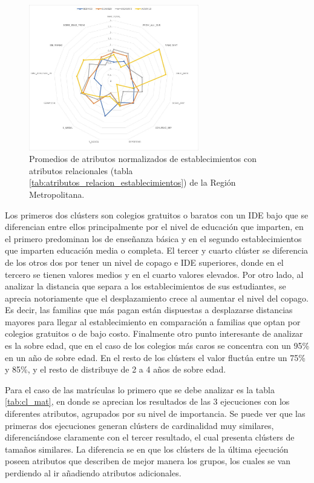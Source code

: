 \begin{figure}[hc]
    \centering
    \includegraphics[width=0.66\textwidth]{images/radar_chart_establecimientos_con.jpg}
    \caption{Promedios de atributos normalizados de establecimientos con atributos relacionales (tabla \ref{tab:atributos_relacion_establecimientos}) de la Región Metropolitana.}
    \label{fig:radar_estab_rel}
\end{figure}

Los primeros dos clústers son colegios gratuitos o baratos con un IDE bajo que se diferencian entre ellos principalmente por el nivel de educación que imparten, en el primero predominan los de enseñanza básica y en el segundo establecimientos que imparten educación media o completa. El tercer y cuarto clúster se diferencia de los otros dos por tener un nivel de copago e IDE superiores, donde en el tercero se tienen valores medios y en el cuarto valores elevados. Por otro lado, al analizar la distancia que separa a los establecimientos de sus estudiantes, se aprecia notoriamente que el desplazamiento crece al aumentar el nivel del copago. Es decir, las familias que más pagan están dispuestas a desplazarse distancias mayores para llegar al establecimiento en comparación a familias que optan por colegios gratuitos o de bajo costo. Finalmente otro punto interesante de analizar es la sobre edad, que en el caso de los colegios más caros se concentra con un 95\% en un año de sobre edad. En el resto de los clústers el valor fluctúa entre un 75\% y 85\%, y el resto de distribuye de 2 a 4 años de sobre edad.

Para el caso de las matrículas lo primero que se debe analizar es la tabla \ref{tab:cl_mat}, en donde se aprecian los resultados de las 3 ejecuciones con los diferentes atributos, agrupados por su nivel de importancia. Se puede ver que las primeras dos ejecuciones generan clústers de cardinalidad muy similares, diferenciándose claramente con el tercer resultado, el cual presenta clústers de tamaños similares. La diferencia se en que los clústers de la última ejecución poseen atributos que describen de mejor manera los grupos, los cuales se van perdiendo al ir añadiendo atributos adicionales. 

